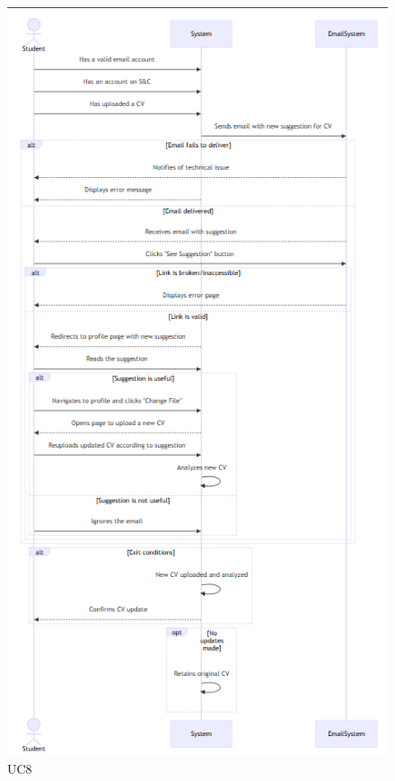 \begin{figure}
    \centering
    \includegraphics[width=0.7\linewidth]{RASD//Images/UC8.png}
    \caption{UC8}
\end{figure}

